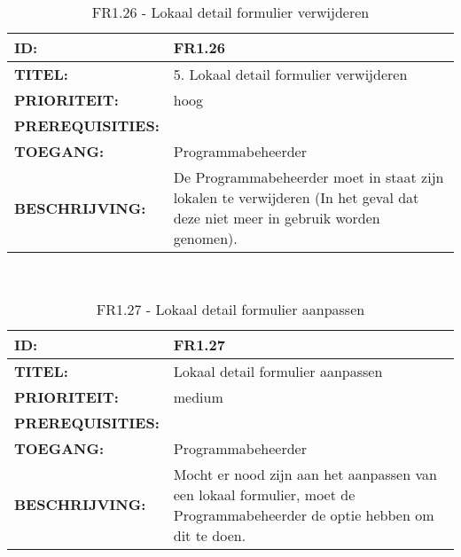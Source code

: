 \noindent\begin{table}[H]
            \begin{tabular}{l | p{10cm}}
                \textbf{ID:} & FR1.26 \\ \hline
                \textbf{TITEL:} & 5. Lokaal detail formulier verwijderen\\ \hline
                \textbf{PRIORITEIT:} &  hoog \\ \hline
                \textbf{PREREQUISITIES:} & \\ \hline
                \textbf{TOEGANG:} & Programmabeheerder \\ \hline
                \textbf{BESCHRIJVING:} & De Programmabeheerder moet in staat zijn lokalen te verwijderen (In het geval dat deze niet meer in gebruik worden genomen).\\ 
            \end{tabular}\\
            \caption{FR1.26 - Lokaal detail formulier verwijderen}
            \label{tab:FR1.26 - Lokaal detail formulier verwijderen}
        \end{table}
        
\noindent\begin{table}[H]
            \begin{tabular}{l | p{10cm}}
                \textbf{ID:} & FR1.27 \\ \hline
                \textbf{TITEL:} & Lokaal detail formulier aanpassen\\ \hline
                \textbf{PRIORITEIT:} &  medium \\ \hline
                \textbf{PREREQUISITIES:} & \\ \hline
                \textbf{TOEGANG:} & Programmabeheerder \\ \hline
                \textbf{BESCHRIJVING:} & Mocht er nood zijn aan het aanpassen van een lokaal formulier, moet de Programmabeheerder de optie hebben om dit te doen.\\ 
            \end{tabular}\\
            \caption{FR1.27 - Lokaal detail formulier aanpassen}
            \label{tab:FR1.27 - Lokaal detail formulier aanpassen}
        \end{table}

